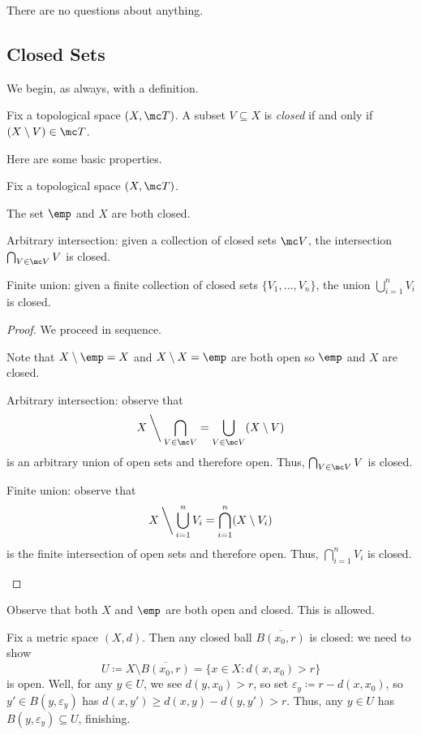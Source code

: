 \documentclass[../notes.tex]{subfiles}
\begin{document}
There are no questions about anything.

\subsection{Closed Sets}
We begin, as always, with a definition.
\begin{definition}[Closed]
	Fix a topological space $(X,\mc T)$. A subset $V\subseteq X$ is \textit{closed} if and only if $(X\setminus V)\in\mc T$.
\end{definition}
Here are some basic properties.
\begin{lemma} \label{lem:closedtop}
	Fix a topological space $(X,\mc T)$.
	\begin{listalph}
		\item The set $\emp$ and $X$ are both closed.
		\item Arbitrary intersection: given a collection of closed sets $\mc V$, the intersection $\bigcap_{V\in\mc V}V$ is closed.
		\item Finite union: given a finite collection of closed sets $\{V_1,\ldots,V_n\}$, the union $\bigcup_{i=1}^nV_i$ is closed.
	\end{listalph}
\end{lemma}
\begin{proof}
	We proceed in sequence.
	\begin{listalph}
		\item Note that $X\setminus\emp=X$ and $X\setminus X=\emp$ are both open so $\emp$ and $X$ are closed.
		\item Arbitrary intersection: observe that
		\[X\mathbin{\bigg\backslash}\bigcap_{V\in\mc V}=\bigcup_{V\in\mc V}(X\setminus V)\]
		is an arbitrary union of open sets and therefore open. Thus, $\bigcap_{V\in\mc V}V$ is closed.
		\item Finite union: observe that
		\[X\mathbin{\bigg\backslash}\bigcup_{i=1}^nV_i=\bigcap_{i=1}^n(X\setminus V_i)\]
		is the finite intersection of open sets and therefore open. Thus, $\bigcap_{i=1}^nV_i$ is closed.
		\qedhere
	\end{listalph}
\end{proof}
\begin{remark}
	Observe that both $X$ and $\emp$ are both open and closed. This is allowed.
\end{remark}
\begin{example}
	Fix a metric space $(X,d)$. Then any closed ball $\overline{B(x_0,r)}$ is closed: we need to show
	\[U\coloneqq X\setminus\overline{B(x_0,r)}=\{x\in X:d(x,x_0)>r\}\]
	is open. Well, for any $y\in U$, we see $d(y,x_0)>r$, so set $\varepsilon_y\coloneqq r-d(x,x_0)$, so $y'\in B(y,\varepsilon_y)$ has $d(x,y')\ge d(x,y)-d(y,y')>r$. Thus, any $y\in U$ has $B(y,\varepsilon_y)\subseteq U$, finishing.
\end{example}
\end{document}
